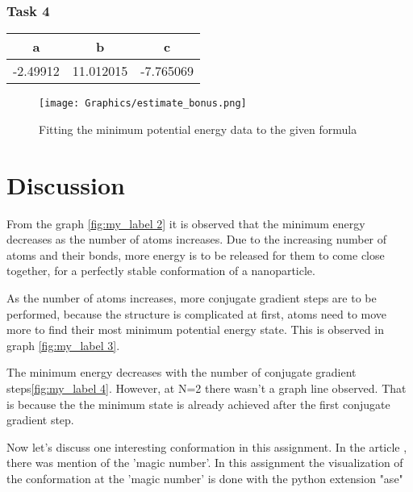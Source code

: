 \documentclass{scrartcl}
\begin{document}
\newpage

\subsubsection{Task 4}

    \begin{table}[h!]
    \centering
    \begin{tabular}{|c|c|c|}
        \hline
        
           a  &  b  &  c\\
        \hline 
           -2.49912   & 11.012015 & -7.765069\\
        \hline
        \end{tabular}
    \end{table}
        
    \begin{figure}[h!]
        \centering
        \texttt{[image: Graphics/estimate\_bonus.png]}
        \caption{Fitting the minimum potential energy data to the given formula}
        \label{fig:my_label 6}
    \end{figure}

\newpage

\section{Discussion}

\par From the graph \ref{fig:my_label 2} it is observed that the minimum energy decreases as the number of atoms increases. Due to the increasing number of atoms and their bonds, more energy is to be released for them to come close together, for a perfectly stable conformation of a nanoparticle. 
\par As the number of atoms increases, more conjugate gradient steps are to be performed, because the structure is complicated at first, atoms need to move more to find their most minimum potential energy state. This is observed in graph \ref{fig:my_label 3}.
\par The minimum energy decreases with the number of conjugate gradient steps\ref{fig:my_label 4}. However, at N=2 there wasn't a graph line observed. That is because the the minimum state is already achieved after the first conjugate gradient step. 
\par Now let's discuss one interesting conformation in this assignment. In the article \cite{GOLJC}, there was mention of the 'magic number'. In this assignment the visualization of the conformation at the 'magic number' is done with the python extension "ase"
\end{document}
